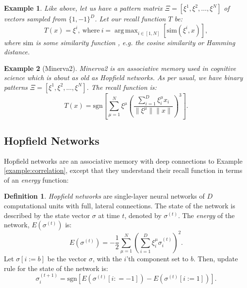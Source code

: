 \documentclass{article}
\DeclareMathOperator*{\argmax}{arg\,max}
\newtheorem{example}{Example}[subsection]
\theoremstyle{definition}
\newtheorem{definition}{Definition}[subsection]
\begin{document}
\begin{example}\label{example:argmax-am}
  Like above, let us have a pattern matrix $\Xi = [\xi^1, \xi^2,
  \dots, \xi^N]$ of
  vectors sampled from $\{1, -1\}^D$. Let our recall function $T$ be:
  \begin{equation}
    T(x) = \xi^i,~\text{where}~i = \argmax_{i \in [1, N]}
    [\text{sim}(\xi^i, x)],
  \end{equation}
  where $\text{sim}$ is some similarity function \parencite{kelly_memory_2017},
  e.g. the cosine similarity or Hamming distance.
\end{example}

\begin{example}[Minerva2]\label{example:minerva2}
  Minerva2 \parencite{hintzman_minerva_1984} is an associative memory
  used in cognitive
  science which is about as old as Hopfield networks. As per usual, we have
  binary patterns $\Xi = [\xi^1, \xi^2, \dots, \xi^N]$. The recall function is:
  \begin{equation}
    T(x) = \text{sgn} \left[ \sum^N_{\mu=1} \xi^\mu \left(
    \frac{\sum^D_{i=1} \xi^\mu_i x_i}{\|\xi^\mu\| \|x\|} \right)^3 \right].
  \end{equation}
\end{example}

\subsection{Hopfield Networks}\label{sec:hopfield-networks}

Hopfield networks
\parencites{hopfield_neural_1982,hopfield_neurons_1984} are an associative
memory with deep connections to Example \ref{example:correlation},
except that they
understand their recall function in terms of an \textit{energy} function:

\begin{definition}\label{def:hopfield-nets}
  \textit{Hopfield networks} are single-layer neural networks of $D$ computational units
  with full, lateral connections. The state of the network is described
  by the state vector $\sigma$ at time $t$, denoted by $\sigma^{(t)}$.
  The \textit{energy} of the network, $E (\sigma^{(t)})$ is:
  \begin{equation}
    E(\sigma^{(t)}) = - \frac{1}{2} \sum^N_{\mu=1} \left(\sum^D_{i=1}
    \xi^\mu_i \sigma^{(t)}_i\right)^2.
  \end{equation}
  Let $\sigma[i := b]$ be the vector $\sigma$, with the $i$'th
  component set to $b$. Then,
  update rule for the state of the network is:
  \begin{equation}
    \sigma^{(t+1)}_i = \text{sgn} \left[ E(\sigma^{(t)}[i : = -1]) -
    E(\sigma^{(t)}[i := 1]) \right].
  \end{equation}
\end{definition}
\end{document}
